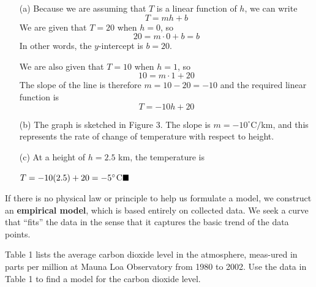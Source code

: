\documentclass{sebase}
\begin{document}
\begin{Solution}
\thinspace \vspace{-6pt}

\begin{enumerate}
\item[(a)] Because we are assuming that $T$ is a linear function of $h$, we
can write 
\begin{equation*}
T=mh+b
\end{equation*}
We are given that $T=20$ when $h=0$, so 
\begin{equation*}
20=m\cdot 0+b=b
\end{equation*}
In other words, the $y$-intercept is $b=20$.

\quad We are also given that $T=10$ when $h=1$, so 
\begin{equation*}
10=m\cdot 1+20
\end{equation*}
The slope of the line is therefore $m=10-20=-10$ and the required linear
function is 
\begin{equation*}
T=-10h+20
\end{equation*}

\item[(b)] The graph is sketched in Figure 3. The slope is $m=-10^{\circ }$C$%
/$km, and this represents the rate of change of temperature with respect to
height.

\item[(c)] At a height of $h=2.5$ km, the temperature is\bigskip

$\hfill T=-10(2.5)+20=-5^{\circ }$C$\hfill \blacksquare $
\end{enumerate}
\end{Solution}

If there is no physical law or principle to help us formulate a model, we
construct an \textbf{empirical model}, which is based entirely on collected
data. We seek a curve that ``fits'' the data in the sense that it captures
the basic trend of the data points.\pagebreak

\begin{Example}[2]
\VIDEO%
%
Table 1 lists the average carbon dioxide level in the atmosphere, meas-ured
in parts per million at Mauna Loa Observatory from 1980 to 2002. Use the
data in Table 1 to find a model for the carbon dioxide level.
\end{Example}
\end{document}
